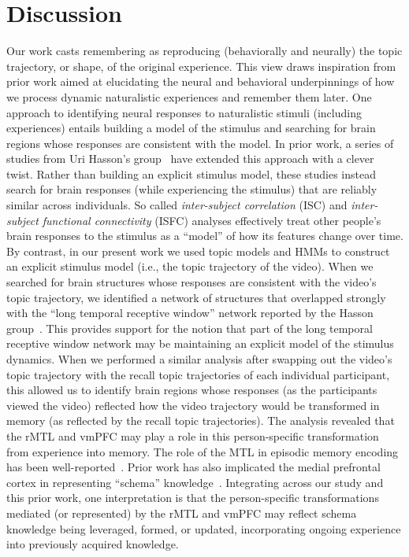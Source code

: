 \documentclass{article}
\begin{document}
\section*{Discussion}
\label{sec:discussion}

Our work casts remembering as reproducing (behaviorally and neurally) the topic trajectory, or shape, of the original experience.  This view draws inspiration from prior work aimed at elucidating the neural and behavioral underpinnings of how we process dynamic naturalistic experiences and remember them later.  One approach to identifying neural responses to naturalistic stimuli (including experiences) entails building a model of the stimulus and searching for brain regions whose responses are consistent with the model.  In prior work, a series of studies from Uri Hasson's group~\citep{LernEtal11, SimoEtal16, ChenEtal17, BaldEtal17, ZadbEtal17} have extended this approach with a clever twist.  Rather than building an explicit stimulus model, these studies instead search for brain responses (while experiencing the stimulus) that are reliably similar across individuals.  So called \textit{inter-subject correlation} (ISC) and \textit{inter-subject functional connectivity} (ISFC) analyses effectively treat other people's brain responses to the stimulus as a ``model'' of how its features change over time.  By contrast, in our present work we used topic models and HMMs to construct an explicit stimulus model (i.e., the topic trajectory of the video).  When we searched for brain structures whose responses are consistent with the video's topic trajectory, we identified a network of structures that overlapped strongly with the ``long temporal receptive window'' network reported by the Hasson group~\citep[e.g., compare our Fig.~\ref{fig:brainz}A with the map of long temporal receptive window voxels in][]{LernEtal11}.  This provides support for the notion that part of the long temporal receptive window network may be maintaining an explicit model of the stimulus dynamics.  When we performed a similar analysis after swapping out the video's topic trajectory with the recall topic trajectories of each individual participant, this allowed us to identify brain regions whose responses (as the participants viewed the video) reflected how the video trajectory would be transformed in memory (as reflected by the recall topic trajectories).  The analysis revealed that the rMTL and vmPFC may play a role in this person-specific transformation from experience into memory.  The role of the MTL in episodic memory encoding has been well-reported~\citep[e.g., ][]{PallWagn02, DavaEtAl03, RangEtal04a, Dava06}.  Prior work has also implicated the medial prefrontal cortex in representing ``schema'' knowledge~\citep[i.e., general knowledge about the format of an ongoing experience given prior similar experiences; ][]{KestEtal12, SchlPres15, GilbMarl17, SpalEtal18}.  Integrating across our study and this prior work, one interpretation is that the person-specific transformations mediated (or represented) by the rMTL and vmPFC may reflect schema knowledge being leveraged, formed, or updated, incorporating ongoing experience into previously acquired knowledge.
\end{document}
